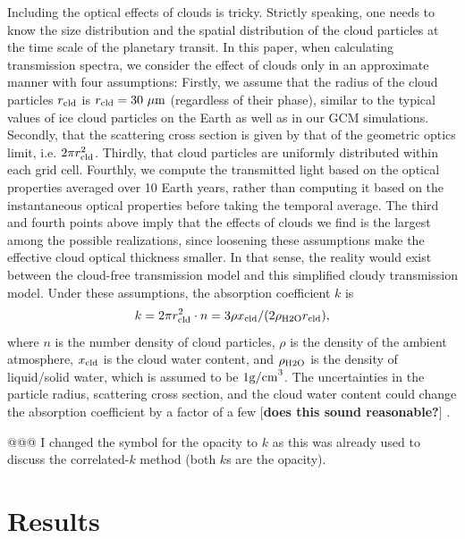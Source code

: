 \documentclass[11pt,numberedappendix,twocolappendix,]{emulateapj}
\def\memo#1{\color{red}$[${\bf #1}$]$ \color{black}}
\newcommand{\dsa}[1]{{\color{blue}#1}}
\begin{document}
Including the optical \dsa{effects} of clouds is tricky. 
\dsa{Strictly} speaking, one needs to know the size distribution and the spatial distribution of the cloud particles at the time scale of the planetary transit. 
In this paper, \dsa{when calculating transmission spectra,} we consider the effect of clouds only in an approximate manner with four assumptions:
%
Firstly, we assume \dsa{that} the radius of the cloud particles $r_{\rm cld}$ is $r_{\rm cld}=30~\mu {\rm m}$ (regardless of their phase), similar to the typical values \dsa{of ice} cloud particles on the Earth as well as in our GCM simulations.  
%
Secondly, \dsa{that} the scattering cross section is \dsa{given by} that of the geometric optics limit, i.e. $2 \pi r_{\rm cld}^2$. 
%
Thirdly, \dsa{that} cloud particles are uniformly distributed within each grid cell. 
%
Fourthly, we compute the transmitted light based on the optical properties averaged over 10 Earth years, rather than computing it based on the instantaneous optical properties \dsa{before taking the temporal average}. 
%
The third and fourth points above imply that the effects of clouds we find is the \dsa{largest among the possible realizations}, since loosening these assumptions \dsa{make} the effective \dsa{cloud} optical thickness smaller. 
In that sense, the reality would exist between the cloud-free transmission model and this simplified cloudy transmission model. 
Under these assumptions, the absorption coefficient $k$ is %
\begin{equation}
k = 2 \pi r_{\rm cld}^2 \cdot n = 3 \rho x_{\rm cld} / ( 2 \rho_{\rm H2O} r_{\rm cld} ),
\end{equation}
where $n$ is the number density of cloud particles, $\rho $ is the density of the ambient atmosphere, $x_{\rm cld}$ is \dsa{the} cloud water content, and $\rho_{\rm H2O}$ is the density of liquid/solid water, which is assumed to be $1 {\rm g/cm}^3$. 
The uncertainties in the particle radius, scattering cross section, and the cloud water content could change the absorption coefficient by a factor of a few \memo{does this sound reasonable?}. 

\dsa{@@@ I changed the symbol for the opacity to $k$ as this was already used to discuss the correlated-$k$ method (both $k$s are the opacity).}

\section{Results}
\label{s:results}
\end{document}
